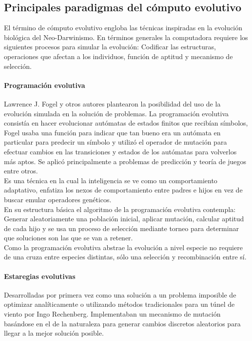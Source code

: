 		\subsection{Principales paradigmas del cómputo evolutivo}

		El término de cómputo evolutivo engloba las técnicas inspiradas en la evolución biológica del Neo-Darwinismo. En términos generales la computadora requiere los siguientes procesos para simular la evolución: Codificar las estructuras, operaciones que afectan a los individuos, función de aptitud y mecanismo de selección.\\

			\paragraph{Programación evolutiva}
			Lawrence J. Fogel y otros autores plantearon la posibilidad del uso de la evolución simulada en la solución de problemas. La programación evolutiva consistía en hacer evolucionar autómatas de estados finitos que recibían símbolos, Fogel usaba una función para indicar que tan bueno era un autómata en particular para predecir un símbolo y utilizó el operador de mutación para efectuar cambios en las transiciones y estados de los autómatas para volverlos más aptos. Se aplicó principalmente a problemas de predicción y teoría de juegos entre otros.\\

			Es una técnica en la cual la inteligencia se ve como un comportamiento adaptativo, enfatiza los nexos de comportamiento entre padres e hijos en vez de buscar  emular operadores genéticos.\\
			
			En su estructura básica el algoritmo de la programación evolutiva contempla: Generar aleatoriamente una población inicial, aplicar mutación, calcular aptitud de cada hijo y se usa un proceso de selección mediante torneo para determinar que soluciones son las que se van a retener.\\

			Como la programación evolutiva abstrae la evolución a nivel especie no requiere de una cruza entre especies distintas, sólo una selección y recombinación entre sí.\\


			\paragraph{Estaregias evolutivas}
			Desarrolladas por primera vez como una solución a un problema imposible de optimizar analíticamente o utilizando métodos tradicionales para un túnel de viento por Ingo Rechenberg. Implementaban un mecanismo de mutación basándose en el de la naturaleza para generar cambios discretos aleatorios para llegar a la mejor solución posible.\\

